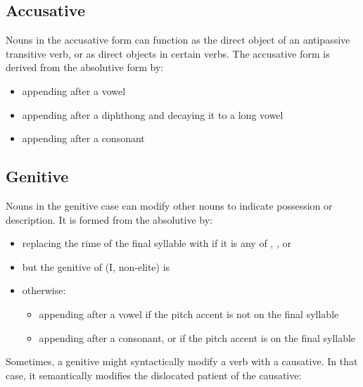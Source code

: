\documentclass{book}
\begin{document}
\subsection{Accusative}

Nouns in the accusative form can function as the direct object of an antipassive transitive verb, or as direct objects in certain verbs. The accusative form is derived from the absolutive form by:

\begin{itemize}
    \item appending  after a vowel
    \item appending  after a diphthong and decaying it to a long vowel
    \item appending  after a consonant
\end{itemize}

\subsection{Genitive}

Nouns in the genitive case can modify other nouns to indicate possession or description. It is formed from the absolutive by:

\begin{itemize}
    \item replacing the rime of the final syllable with  if it is any of , ,  or 
    \item but the genitive of  (I, non-elite) is 
    \item otherwise:
    \begin{itemize}
        \item appending  after a vowel if the pitch accent is not on the final syllable
        \item appending  after a consonant, or if the pitch accent is on the final syllable
    \end{itemize}
\end{itemize}

Sometimes, a genitive might syntactically modify a verb with a causative. In that case, it semantically modifies the dislocated patient of the causative: \\
~\\
  \\
  \\
  
\end{document}

